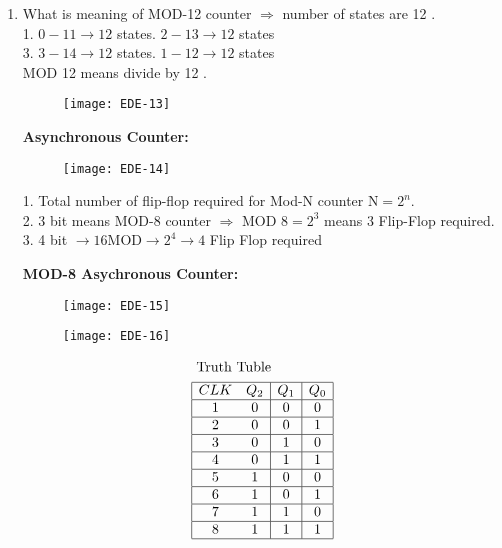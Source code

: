  \begin{enumerate}
\item  	What is meaning of MOD-12 counter $\Rightarrow$ number of states are 12 .\\
1. $0-11 \rightarrow 12$ states. $2-13 \rightarrow 12$ states\\
3. $3-14 \rightarrow 12$ states. $1-12 \rightarrow 12$ states\\
 	MOD 12 means divide by 12 .
 	\begin{figure}[H]
 		\centering
 		\texttt{[image: EDE-13]}
 	\end{figure}
 	\textbf { Asynchronous Counter: }
 		\begin{figure}[H]
 		\centering
 		\texttt{[image: EDE-14]}
 	\end{figure}
 \begin{note}
 		1. Total number of flip-flop required for Mod-N counter $\mathrm{N}=2^{n}$.\\
 	2. 3 bit means MOD-8 counter $\Rightarrow$ MOD $8=2^{3}$ means 3 Flip-Flop required.\\
 	3. 4 bit $\rightarrow 16 \mathrm{MOD} \rightarrow 2^{4} \rightarrow 4$ Flip Flop required
 \end{note}
 	\textbf { MOD-8 Asychronous Counter: }
 	\begin{figure}[H]
 		\centering
 		\texttt{[image: EDE-15]}
 	\end{figure}
 \begin{figure}[H]
 	\centering
 	\texttt{[image: EDE-16]}
 \end{figure}
\begin{align*}
	&\text { Truth Tuble }\\
	&\begin{array}{|cc|c|c|}
		\hline C L K & Q_{2} & Q_{1} & Q_{0} \\
		\hline 1 & 0 & 0 & 0 \\
		\hline 2 & 0 & 0 & 1 \\
		\hline 3 & 0 & 1 & 0 \\
		\hline 4 & 0 & 1 & 1 \\
		\hline 5 & 1 & 0 & 0 \\
		\hline 6 & 1 & 0 & 1 \\
		\hline 7 & 1 & 1 & 0 \\
		\hline 8 & 1 & 1 & 1 \\
		\hline
	\end{array}
\end{align*}

\end{enumerate}
